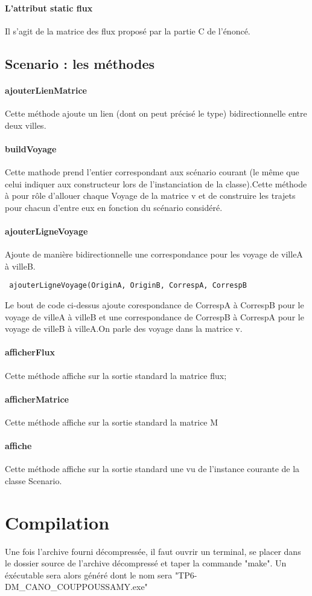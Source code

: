 \documentclass[a4paper]{article}
\begin{document}
		\paragraph{L'attribut static flux}
		Il s'agit de la matrice des flux proposé par la partie C de l'énoncé.
		
		\subsection{Scenario : les méthodes}
		\paragraph{ajouterLienMatrice}
		Cette méthode ajoute un lien (dont on peut précisé le type) bidirectionnelle entre deux villes.
		\paragraph{buildVoyage}
		Cette mathode prend l'entier correspondant aux scénario courant (le même que celui indiquer aux constructeur lors de l'instanciation de la classe).\newline Cette méthode à pour rôle d'allouer chaque Voyage de la matrice v et de construire les trajets pour chacun d'entre eux en fonction du scénario considéré.
		\paragraph{ajouterLigneVoyage}
		Ajoute de manière bidirectionnelle une correspondance  pour les voyage de villeA à villeB.
		\begin{center}\verb| ajouterLigneVoyage(OriginA, OriginB, CorrespA, CorrespB |\end{center}
		Le bout de code ci-dessus ajoute corespondance de CorrespA à CorrespB pour le voyage de villeA à villeB et une correspondance de CorrespB à CorrespA pour le voyage de villeB à villeA.\newline On parle des voyage dans la matrice v.
		\paragraph{afficherFlux}
		Cette méthode affiche sur la sortie standard la matrice flux;
		\paragraph{afficherMatrice}
		Cette méthode affiche sur la sortie standard la matrice M
		\paragraph{affiche}
		Cette méthode affiche sur la sortie standard une vu de l'instance courante de la classe Scenario.
	\section{Compilation}
	Une fois l'archive fourni décompressée, il faut ouvrir un terminal, se placer dans le dossier source de l'archive décompressé et taper la commande "make". Un éxécutable sera alors généré dont le nom sera "TP6-DM\_CANO\_COUPPOUSSAMY.exe"
\end{document}
